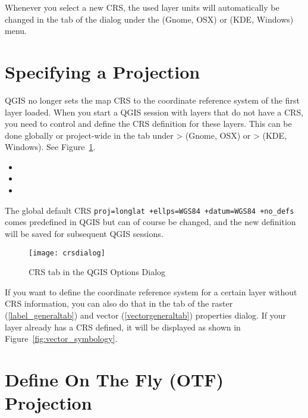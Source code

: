 Whenever you select a new CRS, the used layer units will automatically be 
changed in the  tab of the 
 dialog under the 
 (Gnome, OSX) or  (KDE, Windows) 
menu.

\section{Specifying a Projection}
\label{sec:projection-specifying}

QGIS no longer sets the map CRS to the coordinate reference system of the
first layer loaded. When you start a QGIS session with layers that do not
have a CRS, you need to control and define the CRS definition for these
layers. This can be done globally or project-wide in the  tab under
 >  (Gnome, OSX) 
or  >  (KDE, Windows). 
See Figure~\ref{fig:crsdialog}. 

\begin{itemize}[label=--]
\item {} 
\item {}
\item {}
\end{itemize}

The global default CRS \texttt{proj=longlat +ellps=WGS84 +datum=WGS84
+no\_defs} comes predefined in QGIS but can of course be changed, and the new
definition will be saved for subsequent QGIS sessions.    

\begin{figure}[ht]
   \centering
   \texttt{[image: crsdialog]}
   \caption{CRS tab in the QGIS Options Dialog \nixcaption}\label{fig:crsdialog}
\end{figure}

If you want to define the coordinate reference system for a certain layer
without CRS information, you can also do that in the  tab of the
raster (\ref{label_generaltab}) and vector (\ref{vectorgeneraltab}) properties 
dialog. If your layer already has a CRS defined, it
will be displayed as shown in Figure~\ref{fig:vector_symbology}.

\section{Define On The Fly (OTF) Projection}\label{label_projstart}

